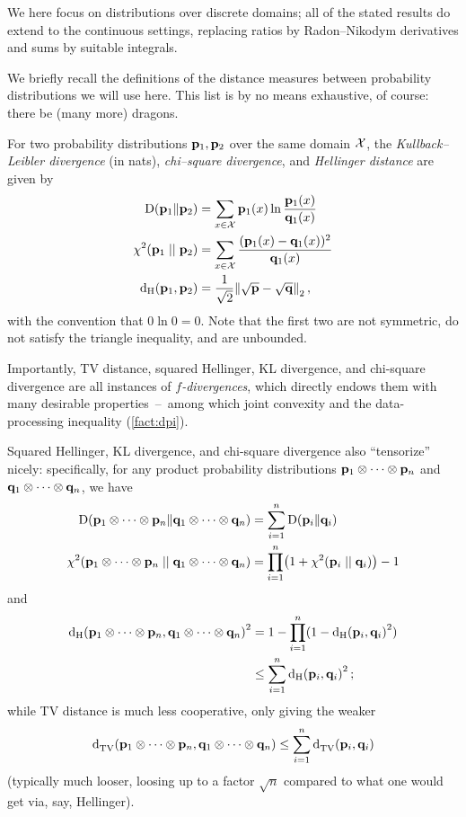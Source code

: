 We here focus on distributions over discrete domains; all of the stated results do extend to the continuous settings, replacing ratios by Radon--Nikodym derivatives and sums by suitable integrals.

We briefly recall the definitions of the distance measures between probability distributions we will use here. This list is by no means exhaustive, of course: there be (many more) dragons. 
\begin{definition}
For two probability distributions $\mathbf{p}_1,\mathbf{p}_2$ over the same domain $\mathcal{X}$, the \emph{Kullback--Leibler divergence} (in nats), \emph{chi--square divergence}, and \emph{Hellinger distance} are given by
\begin{align}
	\kldiv{\p_1}{\p_2} &= \sum_{x\in\domain} \p_1(x) \ln \frac{\p_1(x)}{\q_1(x)} \\
	\chisquare{\p_1}{\p_2} &= \sum_{x\in\domain} \frac{(\p_1(x)-\q_1(x))^2}{\q_1(x)} \\
	\hellinger{\p_1}{\p_2} %
	&= \frac{1}{\sqrt{2}}\normtwo{\sqrt{\p}-\sqrt{\q}}\,,
\end{align}
with the convention that $0\ln 0 = 0$. Note that the first two are not symmetric, do not satisfy the triangle inequality, and are unbounded.
\end{definition}

Importantly, TV distance, squared Hellinger, KL divergence, and chi-square divergence are all instances of \emph{$f$-divergences}, which directly endows them with many desirable properties~--~among which joint convexity and the data-processing inequality (\cref{fact:dpi}).

Squared Hellinger, KL divergence, and chi-square divergence also ``tensorize'' nicely: specifically, for any product probability distributions $\mathbf{p}_1\otimes\cdots\otimes\mathbf{p}_n$ and $\mathbf{q}_1\otimes\cdots\otimes\mathbf{q}_n$, we have
\begin{align}
\kldiv{\p_1\otimes\cdots\otimes\p_n}{\q_1\otimes\cdots\otimes\q_n} 
&= \sum_{i=1}^n \kldiv{\p_i}{\q_i} \\
\chisquare{\p_1\otimes\cdots\otimes\p_n}{\q_1\otimes\cdots\otimes\q_n} 
&= \prod_{i=1}^n \Paren{1+\chisquare{\p_i}{\q_i}} - 1
\end{align}
and
\begin{align}
\hellinger{\p_1\otimes\cdots\otimes\p_n}{\q_1\otimes\cdots\otimes\q_n}^2 
&= 1 - \prod_{i=1}^n (1-\hellinger{\p_i}{\q_i}^2) \notag\\
&\leq \sum_{i=1}^n \hellinger{\p_i}{\q_i}^2\,;
\end{align}
while TV distance is much less cooperative, only giving the weaker
\begin{equation}
\totalvardist{\p_1\otimes\cdots\otimes\p_n}{\q_1\otimes\cdots\otimes\q_n} \leq \sum_{i=1}^n \totalvardist{\p_i}{\q_i}
\end{equation}
(typically much looser, loosing up to a factor $\sqrt{n}$ compared to what one would get via, say, Hellinger).

